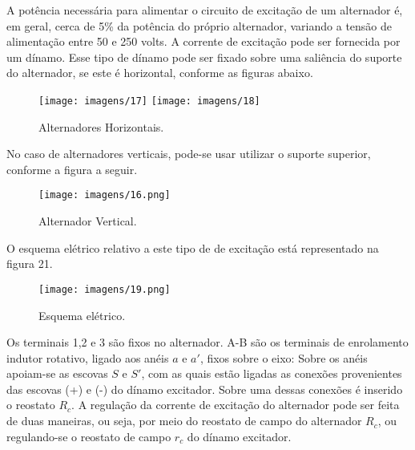 A potência necessária para alimentar o circuito de excitação de um alternador é, em geral, cerca de 5\% da potência do próprio alternador, variando a tensão de alimentação entre 50 e 250 volts. A corrente de excitação pode ser fornecida por um dínamo. Esse tipo de dínamo pode ser fixado sobre uma saliência do suporte do alternador, se este é horizontal, conforme as figuras abaixo.  

\begin{figure}[ht!]
\center
\texttt{[image: imagens/17]}
\texttt{[image: imagens/18]}
\caption{Alternadores Horizontais.}
\end{figure}

No caso de alternadores verticais, pode-se usar utilizar o suporte superior, conforme a figura a seguir.

\begin{figure}[ht!]
\center 
\texttt{[image: imagens/16.png]}
\caption{Alternador Vertical.}
\end{figure}
\newpage

O esquema elétrico relativo a este tipo de de excitação está representado na figura 21.

\begin{figure}[ht!]
\center 
\texttt{[image: imagens/19.png]}
\caption{Esquema elétrico.}
\end{figure}

Os terminais 1,2 e 3 são fixos no alternador. A-B são os terminais de enrolamento indutor rotativo, ligado aos anéis $a$ e $a'$, fixos sobre o eixo: Sobre os anéis apoiam-se as escovas $S$ e $S'$, com as quais estão ligadas as conexões provenientes das escovas (+) e (-) do dínamo excitador. Sobre uma dessas conexões é inserido o reostato $R_c$. A regulação da corrente de excitação do alternador pode ser feita de duas maneiras, ou seja, por meio do reostato de campo do alternador $R_c$, ou regulando-se o reostato de campo $r_c$ do dínamo excitador.

